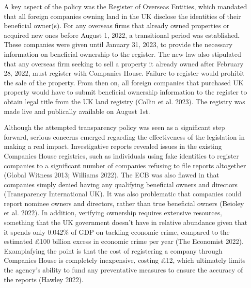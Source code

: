 \documentclass{article}
\begin{document}
A key aspect of the policy was the Register of Overseas Entities, which mandated that all foreign companies owning land in the UK disclose the identities of their beneficial owner(s). For any overseas firms that already owned properties or acquired new ones before August 1, 2022, a transitional period was established. These companies were given until January 31, 2023, to provide the necessary information on beneficial ownership to the register. The new law also stipulated that any overseas firm seeking to sell a property it already owned after February 28, 2022, must register with Companies House. Failure to register would prohibit the sale of the property. From then on, all foreign companies that purchased UK property would have to submit beneficial ownership information to the register to obtain legal title from the UK land registry (Collin et al. 2023). The registry was made live and publically available on August 1st.

Although the attempted transparency policy was seen as a significant step forward, serious concerns emerged regarding the effectiveness of the legislation in making a real impact. Investigative reports revealed issues in the existing Companies House registries, such as individuals using fake identities to register companies to a significant number of companies refusing to file reports altogether (Global Witness 2013; Williams 2022). The ECB was also flawed in that companies simply denied having any qualifying beneficial owners and directors (Transparency International UK). It was also problematic that companies could report nominee owners and directors, rather than true beneficial owners (Beioley et al. 2022). In addition, verifying ownership requires extensive resources, something that the UK government doesn't have in relative abundance given that it spends only 0.042\% of GDP on tackling economic crime, compared to the estimated £100 billion excess in economic crime per year (The Economist 2022). Examplafying the point is that the cost of registering a company through Companies House is completely inexpensive, costing £12, which ultimately limits the agency's ability to fund any preventative measures to ensure the accuracy of the reports (Hawley 2022).  
\end{document}
